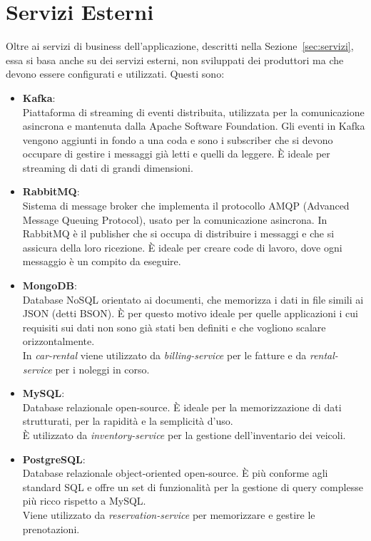 \section{Servizi Esterni}
\label{sec:servizi_esterni}
Oltre ai servizi di business dell'applicazione, descritti nella Sezione~\ref{sec:servizi}, essa si basa anche su dei servizi esterni, non sviluppati dei produttori ma che devono essere configurati e utilizzati. Questi sono:
\begin{itemize}
    \item \textbf{Kafka}: \\
        Piattaforma di streaming di eventi distribuita, utilizzata per la comunicazione asincrona e mantenuta dalla Apache Software Foundation. Gli eventi in Kafka vengono aggiunti in fondo a una coda e sono i subscriber che si devono occupare di gestire i messaggi già letti e quelli da leggere. È ideale per streaming di dati di grandi dimensioni.
    \item \textbf{RabbitMQ}: \\
        Sistema di message broker che implementa il protocollo AMQP (Advanced Message Queuing Protocol), usato per la comunicazione asincrona. In RabbitMQ è il publisher che si occupa di distribuire i messaggi e che si assicura della loro ricezione. È ideale per creare code di lavoro, dove ogni messaggio è un compito da eseguire.
    \item \textbf{MongoDB}: \\
        Database NoSQL orientato ai documenti, che memorizza i dati in file simili ai JSON (detti BSON). È per questo motivo ideale per quelle applicazioni i cui requisiti sui dati non sono già stati ben definiti e che vogliono scalare orizzontalmente. \\
        In \textit{car-rental} viene utilizzato da \textit{billing-service} per le fatture e da \textit{rental-service} per i noleggi in corso.
    \item \textbf{MySQL}: \\
        Database relazionale open-source. È ideale per la memorizzazione di dati strutturati, per la rapidità e la semplicità d'uso. \\
        È utilizzato da \textit{inventory-service} per la gestione dell'inventario dei veicoli.
    \item \textbf{PostgreSQL}: \\
        Database relazionale object-oriented open-source. È più conforme agli standard SQL e offre un set di funzionalità per la gestione di query complesse più ricco rispetto a MySQL. \\
        Viene utilizzato da \textit{reservation-service} per memorizzare e gestire le prenotazioni.
\end{itemize}

